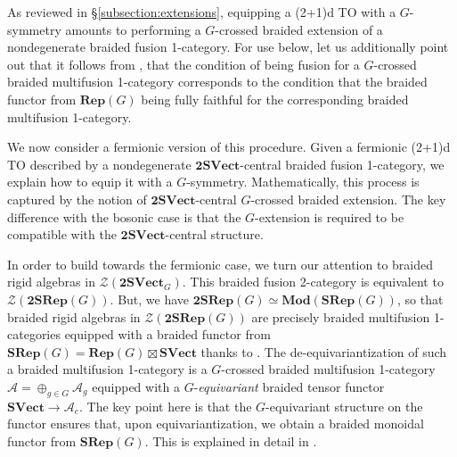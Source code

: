 \documentclass[11pt,reqno]{amsart}
\newcommand{\Mod}{\mathbf{Mod}}
\newcommand{\SVect}{\mathbf{SVect}}
\newcommand{\tSVect}{\mathbf{2SVect}}
\newcommand{\cZ}{\mathcal{Z}}
\numberwithin{equation}{section}
\theoremstyle{plain}
\theoremstyle{definition}
\begin{document}
As reviewed in \S\ref{subsection:extensions}, equipping a (2+1)d TO with a $G$-symmetry amounts to performing a $G$-crossed braided extension of a nondegenerate braided fusion 1-category. For use below, let us additionally point out that it follows from \cite[Theorem 4.18(iii)]{DGNO}, that the condition of being fusion for a $G$-crossed braided multifusion 1-category corresponds to the condition that the braided functor from $\mathbf{Rep}(G)$ being fully faithful for the corresponding braided multifusion 1-category.

We now consider a fermionic version of this procedure. Given a fermionic (2+1)d TO described by a nondegenerate $\mathbf{2SVect}$-central braided fusion 1-category, we explain how to equip it with a $G$-symmetry. Mathematically, this process is captured by the notion of $\mathbf{2SVect}$-central $G$-crossed braided extension. The key difference with the bosonic case is that the $G$-extension is required to be compatible with the $\tSVect$-central structure.

In order to build towards the fermionic case, we turn our attention to braided rigid algebras in $\cZ(\tSVect_G)$.
This braided fusion 2-category is equivalent to $\cZ(\mathbf{2SRep}(G))$.
But, we have $\mathbf{2SRep}(G) \simeq \Mod (\mathbf{SRep}(G))$, so that braided rigid algebras in $\cZ(\mathbf{2SRep}(G))$ are precisely braided multifusion 1-categories equipped with a braided functor from $\mathbf{SRep}(G) = \mathbf{Rep}(G)\boxtimes \SVect$ thanks to \cite[Theorem 4.11]{davydov2021braided}.
The de-equivariantization of such a braided multifusion 1-category is a $G$-crossed braided multifusion 1-category $\mathcal{A} = \oplus_{g\in G}\mathcal{A}_g$ equipped with a $G$-\textit{equivariant} braided tensor functor $\SVect\rightarrow\mathcal{A}_e$. The key point here is that the $G$-equivariant structure on the functor ensures that, upon equivariantization, we obtain a braided monoidal functor from $\mathbf{SRep}(G)$. This is explained in detail in \cite[Theorem 3.13]{GVR}.
\end{document}
